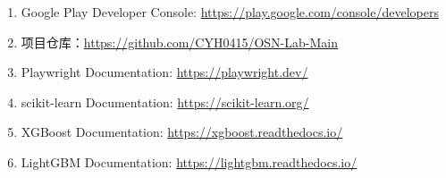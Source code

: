 \documentclass[UTF8]{ctexart}
\begin{document}
\begin{enumerate}[leftmargin=2em]
  \item Google Play Developer Console: \url{https://play.google.com/console/developers}
  \item 项目仓库：\url{https://github.com/CYH0415/OSN-Lab-Main}
  \item Playwright Documentation: \url{https://playwright.dev/}
  \item scikit-learn Documentation: \url{https://scikit-learn.org/}
  \item XGBoost Documentation: \url{https://xgboost.readthedocs.io/}
  \item LightGBM Documentation: \url{https://lightgbm.readthedocs.io/}
\end{enumerate}

\label{LastPage}
\end{document}
